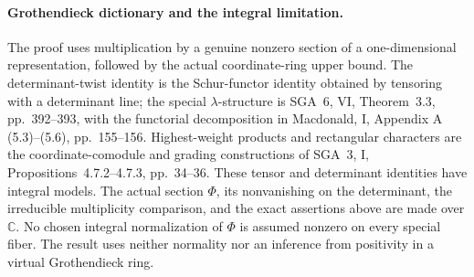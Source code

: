 \paragraph{Grothendieck dictionary and the integral limitation.}
The proof uses multiplication by a genuine nonzero section
of a one-dimensional representation, followed by the
actual coordinate-ring upper bound.
The determinant-twist identity is the Schur-functor
identity obtained by tensoring with a determinant line;
the special \(\lambda\)-structure is SGA~6, VI,
Theorem~3.3, pp.~392--393, with the functorial decomposition
in Macdonald, I, Appendix A (5.3)--(5.6), pp.~155--156.
Highest-weight products and rectangular characters are
the coordinate-comodule and grading constructions of
SGA~3, I, Propositions~4.7.2--4.7.3, pp.~34--36.
These tensor and determinant identities have integral
models. The actual section \(\Phi\), its nonvanishing on
the determinant, the irreducible multiplicity comparison,
and the exact assertions above are made over
\(\mathbb C\).
No chosen integral normalization of \(\Phi\) is assumed
nonzero on every special fiber.
The result uses neither normality nor an inference from
positivity in a virtual Grothendieck ring.
